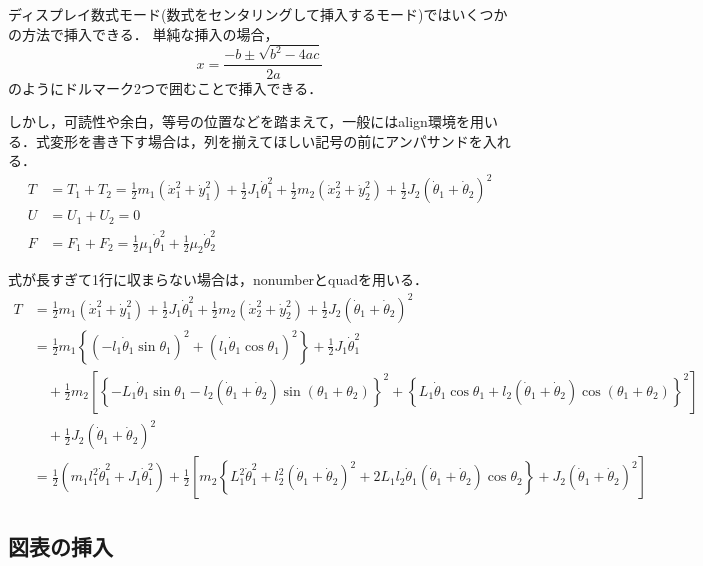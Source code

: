 ディスプレイ数式モード(数式をセンタリングして挿入するモード)ではいくつかの方法で挿入できる．
単純な挿入の場合，$$x=\frac{-b\pm\sqrt{b^{2}-4ac}}{2a}$$のようにドルマーク2つで囲むことで挿入できる．

しかし，可読性や余白，等号の位置などを踏まえて，一般にはalign環境を用いる．式変形を書き下す場合は，列を揃えてほしい記号の前にアンパサンドを入れる．
\begin{align}
	T &= T_{1} + T_{2} = \frac{1}{2}m_{1}\left(\dot x_{1}^{2} + \dot y_{1}^{2}\right) + \frac{1}{2}J_{1}\dot\theta_{1}^{2} + \frac{1}{2}m_{2}\left(\dot x_{2}^{2} + \dot y_{2}^{2}\right) + \frac{1}{2}J_{2}\left(\dot\theta_{1} + \dot\theta_{2}\right)^{2} \label{eq:T}\\
	U &= U_{1} + U_{2} = 0 \label{eq:U}\\
	F &= F_{1} + F_{2} = \frac{1}{2}\mu_{1}\dot\theta_{1}^{2}  + \frac{1}{2}\mu_{2}\dot\theta_{2}^{2} \label{eq:F}
\end{align}

式が長すぎて1行に収まらない場合は，nonumberとquadを用いる．
\begin{align}
	T &=  \frac{1}{2}m_{1}\left(\dot x_{1}^{2} + \dot y_{1}^{2}\right) + \frac{1}{2}J_{1}\dot\theta_{1}^{2} + \frac{1}{2}m_{2}\left(\dot x_{2}^{2} + \dot y_{2}^{2}\right) + \frac{1}{2}J_{2}\left(\dot\theta_{1} + \dot\theta_{2}\right)^{2} \nonumber\\
    &= \frac{1}{2}m_{1}\left\{(-l_{1}\dot\theta_{1}\sin\theta_{1})^{2} + (l_{1}\dot\theta_{1}\cos\theta_{1})^{2}\right\} + \frac{1}{2}J_{1}\dot\theta_{1}^{2} \nonumber\\
    &\quad +\frac{1}{2}m_{2}\left[ \left\{ -L_{1}\dot\theta_{1}\sin\theta_{1} -l_{2}(\dot\theta_{1}+\dot\theta_{2})\sin(\theta_{1}+\theta_{2})\right\}^{2} + \left\{ L_{1}\dot\theta_{1}\cos\theta_{1} + l_{2}(\dot\theta_{1}+\dot\theta_{2})\cos(\theta_{1}+\theta_{2})\right\}^{2} \right] \nonumber\\
    &\quad + \frac{1}{2}J_{2}(\dot\theta_{1}+\dot\theta_{2})^{2} \label{eq:Tarray1}\\
    &= \frac{1}{2}(m_{1}l_{1}^{2}\dot\theta_{1}^{2} + J_{1}\dot\theta_{1}^{2}) 
    + \frac{1}{2}\left[ m_{2}\left\{L_{1}^{2}\dot\theta_{1}^{2} + l_{2}^{2}(\dot\theta_{1}+\dot\theta_{2})^{2} + 2L_{1}l_{2}\dot\theta_{1}(\dot\theta_{1} + \dot\theta_{2})\cos\theta_{2}\right\} + J_{2}(\dot\theta_{1}+\dot\theta_{2})^{2}\right] \label{eq:Tarray}
\end{align}

\subsection{図表の挿入}\label{sec:図表}

